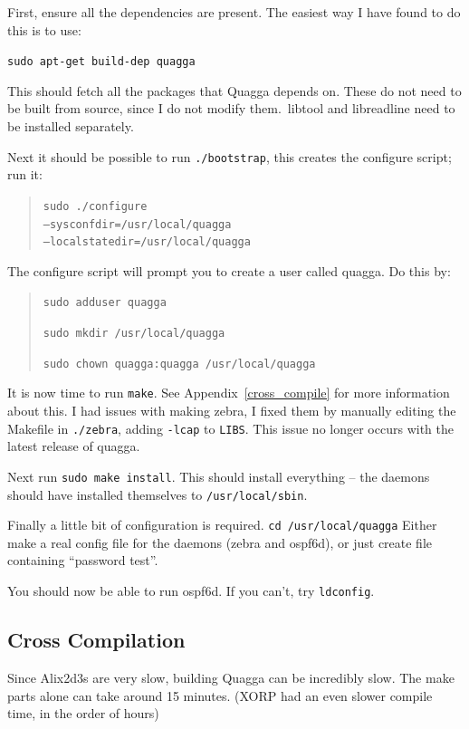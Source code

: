 First, ensure all the dependencies are present. The easiest
way I have found to do this is to use:

\texttt{sudo apt-get build-dep quagga}

This should fetch all the packages that Quagga depends on. These do not need to
be built from source, since I do not modify them.\ libtool and libreadline need
to be installed separately. 


Next it should be possible to run \texttt{\@./bootstrap}, this creates the
configure script; run it:

\begin{quote}
\texttt{sudo \@./configure \\ --sysconfdir=/usr/local/quagga \\ --localstatedir=/usr/local/quagga}
\end{quote}

The configure script will prompt you to create a user called quagga. Do this by:

\begin{quote}
\texttt{sudo adduser quagga}

\texttt{sudo mkdir /usr/local/quagga}

\texttt{sudo chown quagga:quagga /usr/local/quagga}
\end{quote}

It is now time to run \texttt{make}. See Appendix~\ref{cross_compile} for more
information about this. I had issues with making zebra, I fixed them by
manually editing the Makefile in \texttt{\@./zebra}, adding \texttt{-lcap} to
\texttt{LIBS}\@. This issue no longer occurs with the latest release of quagga.

Next run \texttt{sudo make install}. This should install everything -- the daemons
should have installed themselves to \texttt{/usr/local/sbin}.

Finally a little bit of configuration is required. \texttt{cd
/usr/local/quagga} Either make a real config file for the daemons (zebra and
ospf6d), or just create file containing ``password test''.

You should now be able to run ospf6d. If you can't, try \texttt{ldconfig}.

\subsection*{Cross Compilation}
\label{cross_compile}
Since Alix2d3s are very slow, building Quagga can be incredibly slow. The make
parts alone can take around 15 minutes. (XORP had an even slower compile time,
in the order of hours) 

